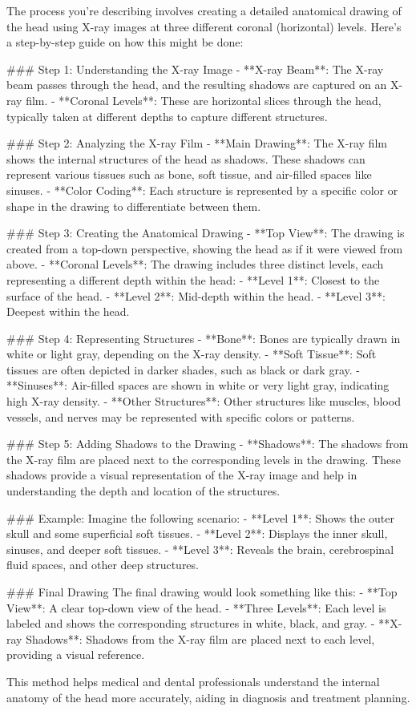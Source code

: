 The process you're describing involves creating a detailed anatomical drawing of the head using X-ray images at three different coronal (horizontal) levels. Here’s a step-by-step guide on how this might be done:

### Step 1: Understanding the X-ray Image
- **X-ray Beam**: The X-ray beam passes through the head, and the resulting shadows are captured on an X-ray film.
- **Coronal Levels**: These are horizontal slices through the head, typically taken at different depths to capture different structures.

### Step 2: Analyzing the X-ray Film
- **Main Drawing**: The X-ray film shows the internal structures of the head as shadows. These shadows can represent various tissues such as bone, soft tissue, and air-filled spaces like sinuses.
- **Color Coding**: Each structure is represented by a specific color or shape in the drawing to differentiate between them.

### Step 3: Creating the Anatomical Drawing
- **Top View**: The drawing is created from a top-down perspective, showing the head as if it were viewed from above.
- **Coronal Levels**: The drawing includes three distinct levels, each representing a different depth within the head:
  - **Level 1**: Closest to the surface of the head.
  - **Level 2**: Mid-depth within the head.
  - **Level 3**: Deepest within the head.

### Step 4: Representing Structures
- **Bone**: Bones are typically drawn in white or light gray, depending on the X-ray density.
- **Soft Tissue**: Soft tissues are often depicted in darker shades, such as black or dark gray.
- **Sinuses**: Air-filled spaces are shown in white or very light gray, indicating high X-ray density.
- **Other Structures**: Other structures like muscles, blood vessels, and nerves may be represented with specific colors or patterns.

### Step 5: Adding Shadows to the Drawing
- **Shadows**: The shadows from the X-ray film are placed next to the corresponding levels in the drawing. These shadows provide a visual representation of the X-ray image and help in understanding the depth and location of the structures.

### Example:
Imagine the following scenario:
- **Level 1**: Shows the outer skull and some superficial soft tissues.
- **Level 2**: Displays the inner skull, sinuses, and deeper soft tissues.
- **Level 3**: Reveals the brain, cerebrospinal fluid spaces, and other deep structures.

### Final Drawing
The final drawing would look something like this:
- **Top View**: A clear top-down view of the head.
- **Three Levels**: Each level is labeled and shows the corresponding structures in white, black, and gray.
- **X-ray Shadows**: Shadows from the X-ray film are placed next to each level, providing a visual reference.

This method helps medical and dental professionals understand the internal anatomy of the head more accurately, aiding in diagnosis and treatment planning.
